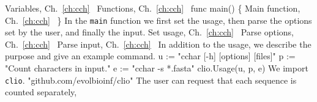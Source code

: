 \LA{}Variables, Ch.~\ref{ch:cch}~{\nwtagstyle{}}\RA{}
\LA{}Functions, Ch.~\ref{ch:cch}~{\nwtagstyle{}}\RA{}
func main() \{
          \LA{}Main function, Ch.~\ref{ch:cch}~{\nwtagstyle{}}\RA{}
\}
\nwendcode{}\nwdocspar
In the \texttt{main} function we first set the usage, then parse the
options set by the user, and finally the input.
\nwenddocs{}\endmoddef\nwstartdeflinemarkup{}\nwenddeflinemarkup
\LA{}Set usage, Ch.~\ref{ch:cch}~{\nwtagstyle{}}\RA{}
\LA{}Parse options, Ch.~\ref{ch:cch}~{\nwtagstyle{}}\RA{}
\LA{}Parse input, Ch.~\ref{ch:cch}~{\nwtagstyle{}}\RA{}
\nwendcode{}\nwdocspar
In addition to the usage, we describe the purpose and give an example
command.
\nwenddocs{}\endmoddef\nwstartdeflinemarkup{}\nwenddeflinemarkup
u := "cchar [-h] [options] [files]"
p := "Count characters in input."
e := "cchar -s *.fasta"
clio.Usage(u, p, e)
\nwendcode{}\nwdocspar
We import \texttt{clio}.
\nwenddocs{}\endmoddef\nwstartdeflinemarkup{}\nwenddeflinemarkup
"github.com/evolbioinf/clio"
\nwendcode{}\nwdocspar
The user can request that each sequence is counted separately,
